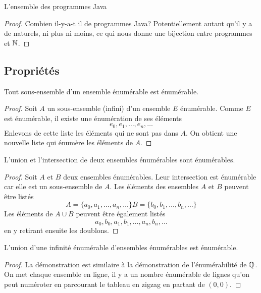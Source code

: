  \begin{myexem}
  L'ensemble des programmes Java
  \begin{proof}
  Combien il-y-a-t il de programmes Java? Potentiellement autant qu'il y a de naturels, ni plus ni moins, ce qui nous donne une bijection entre programmes et $\mathbb{N}$. 
  \end{proof}
\end{myexem}

\subsection{Propriétés}
\label{subsec:proprietes}

\begin{myprop}
	Tout sous-ensemble d'un ensemble énumérable est énumérable.
	\begin{proof}
Soit $A$ un sous-ensemble (infini) d'un ensemble $E$ énumérable.  Comme $E$ est énumérable, il existe une énumération de ses éléments
\[
e_0, e_1, \ldots , e_n, \ldots
\]
Enlevons de cette liste les éléments qui ne sont pas dans $A$.  On obtient une nouvelle liste qui énumère les éléments de $A$.
	\end{proof}
\end{myprop}

\begin{myprop}
	L'union et l'intersection de deux ensembles énumérables sont énumérables.
	\begin{proof}
		Soit $A$ et $B$ deux ensembles énumérables.  Leur intersection est énumérable car elle est un sous-ensemble de $A$.   Les éléments des ensembles $A$ et $B$ peuvent être listés
\[
A = \{ a_0, a_1, \ldots , a_n, \ldots\}  
B = \{ b_0, b_1, \ldots , b_n, \ldots\} 
\]
Les éléments de $A \cup B$ peuvent être également listés 
\[
a_0, b_0, a_1, b_1, \ldots, a_n, b_n, \ldots
\]
en y retirant ensuite les doublons.
	\end{proof}
\end{myprop}

\begin{myprop}
	L'union d'une infinité énumérable d'ensembles énumérables est énumérable.
    \begin{proof}
      La démonstration est similaire à la démonstration de l'énumérabilité de $\mathbb{Q}$.
      On met chaque ensemble en ligne, il y a un nombre énumérable de lignes qu'on peut numéroter en parcourant le tableau en zigzag
      en partant de $(0,0)$.
    \end{proof}
\end{myprop}

